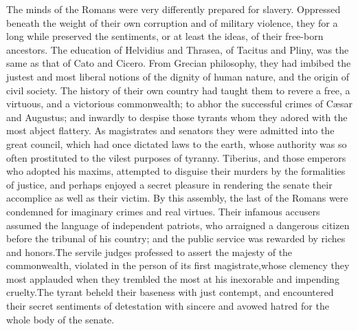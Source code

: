 
The minds of the Romans were very differently prepared for
slavery. Oppressed beneath the weight of their own corruption and
of military violence, they for a long while preserved the
sentiments, or at least the ideas, of their free-born ancestors.
The education of Helvidius and Thrasea, of Tacitus and Pliny, was
the same as that of Cato and Cicero. From Grecian philosophy,
they had imbibed the justest and most liberal notions of the
dignity of human nature, and the origin of civil society. The
history of their own country had taught them to revere a free, a
virtuous, and a victorious commonwealth; to abhor the successful
crimes of Cæsar and Augustus; and inwardly to despise those
tyrants whom they adored with the most abject flattery. As
magistrates and senators they were admitted into the great
council, which had once dictated laws to the earth, whose
authority was so often prostituted to the vilest purposes of
tyranny. Tiberius, and those emperors who adopted his maxims,
attempted to disguise their murders by the formalities of
justice, and perhaps enjoyed a secret pleasure in rendering the
senate their accomplice as well as their victim. By this
assembly, the last of the Romans were condemned for imaginary
crimes and real virtues. Their infamous accusers assumed the
language of independent patriots, who arraigned a dangerous
citizen before the tribunal of his country; and the public
service was rewarded by riches and honors.\footnotemark[55] The servile judges
professed to assert the majesty of the commonwealth, violated in
the person of its first magistrate,\footnotemark[56] whose clemency they most
applauded when they trembled the most at his inexorable and
impending cruelty.\footnotemark[57] The tyrant beheld their baseness with just
contempt, and encountered their secret sentiments of detestation
with sincere and avowed hatred for the whole body of the senate.


